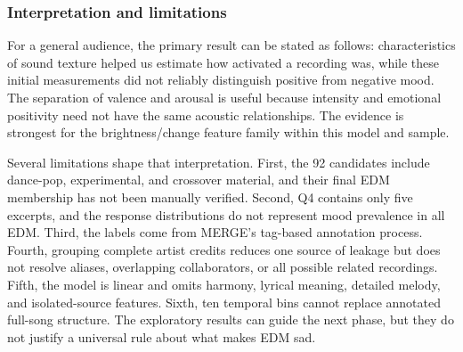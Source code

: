 \subsubsection{Interpretation and limitations}

For a general audience, the primary result can be stated as follows: characteristics of sound texture helped us estimate how activated a recording was, while these initial measurements did not reliably distinguish positive from negative mood. The separation of valence and arousal is useful because intensity and emotional positivity need not have the same acoustic relationships. The evidence is strongest for the brightness/change feature family within this model and sample.

Several limitations shape that interpretation. First, the 92 candidates include dance-pop, experimental, and crossover material, and their final EDM membership has not been manually verified. Second, Q4 contains only five excerpts, and the response distributions do not represent mood prevalence in all EDM. Third, the labels come from MERGE's tag-based annotation process. Fourth, grouping complete artist credits reduces one source of leakage but does not resolve aliases, overlapping collaborators, or all possible related recordings. Fifth, the model is linear and omits harmony, lyrical meaning, detailed melody, and isolated-source features. Sixth, ten temporal bins cannot replace annotated full-song structure. The exploratory results can guide the next phase, but they do not justify a universal rule about what makes EDM sad.

